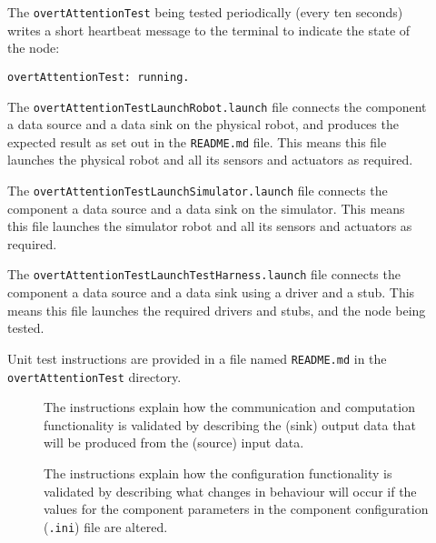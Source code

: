 \documentclass{CSSRforAfrica}
\newcommand{\checkboxChecked}{\fbox{\ding{51}}} %
\newcommand{\checkboxDashed}{\fbox{--}}         %
\begin{document}
\begin{description}
\item[\checkboxChecked]  The {\small \verb+overtAttentionTest+} being tested periodically (every ten seconds) writes a short heartbeat message to
 the terminal to indicate the state of the node:
\begin{verbatim}
overtAttentionTest: running.
\end{verbatim}

\item[\checkboxChecked] The {\small \verb+overtAttentionTestLaunchRobot.launch+} file  connects the component a data source and a data sink on the physical robot, and produces the expected result as set out in the  {\small \verb+README.md+}  file.    This means this file launches the physical robot and all its sensors and actuators as required.

\item[\checkboxDashed] The {\small \verb+overtAttentionTestLaunchSimulator.launch+} file  connects the component a data source and a data sink on the simulator.   This means this file launches the simulator robot and all its sensors and actuators as required.

\item[\checkboxChecked] The {\small \verb+overtAttentionTestLaunchTestHarness.launch+} file  connects the component a data source and a data sink using a driver and a stub.   This means this file launches the required drivers and stubs, and the node being tested.

\item[\checkboxChecked] Unit test instructions are provided in a file named {\small \verb+README.md+} in the  {\small \verb+overtAttentionTest+} directory. 


\begin{description}

\item[\checkboxChecked] The instructions explain how the communication and computation functionality is validated by describing the (sink) output data that will be produced from the (source) input data.  

\item[\checkboxChecked] The instructions explain how the configuration functionality is validated by describing what changes in behaviour will occur if the values for the component parameters in the component configuration ({\small \verb+.ini+}) file are altered.

\end{description}

\end{description} 
\end{document}
